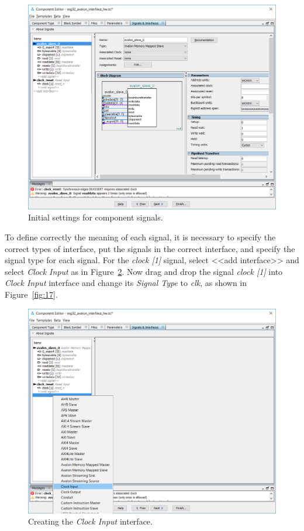 \documentclass[11pt, twoside, pdftex]{article}
\begin{document}
\begin{figure}[H]
   \begin{center}
        \includegraphics[scale=0.6]{figures/figure15.png}
   \end{center}
   \caption{Initial settings for component signals.}
	\label{fig:15}
\end{figure}

\clearpage
\newpage
To define correctly the meaning of each signal, it is necessary to specify the correct types of interface,
put the signals in the correct interface, and specify the signal type for each signal. For the {\it clock [1]} signal, 
select {\sf <{}<add interface>{}>} and select {\it Clock Input} as in Figure~\ref{fig:16}. Now drag and drop the signal {\it clock [1]} into {\it Clock Input} interface and change its {\it Signal Type} to {\it clk}, as shown in Figure~\ref{fig:17}.

\begin{figure}[H]
   \begin{center}
        \includegraphics[scale=0.6]{figures/figure16.png}
   \end{center}
   \caption{Creating the {\it Clock Input} interface.}
	\label{fig:16}
\end{figure}
\end{document}

